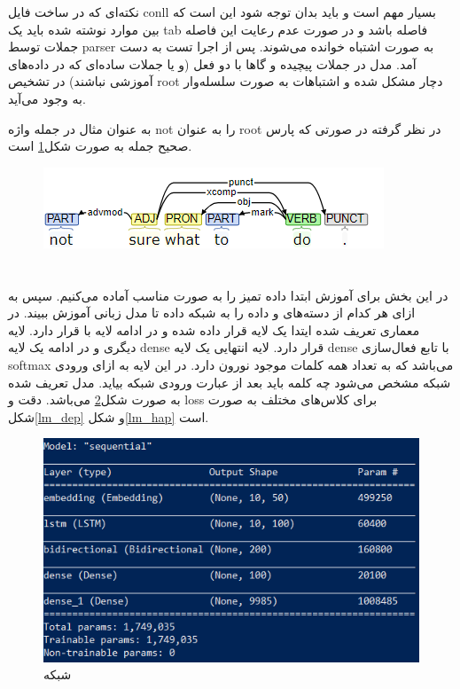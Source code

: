 \documentclass[10pt]{article}
\begin{document}
نکته‌‌ای که در ساخت فایل conll بسیار مهم است و باید بدان توجه شود این است که بین موارد نوشته شده باید یک tab فاصله باشد و در صورت عدم رعایت این فاصله جملات توسط parser به صورت اشتباه خوانده می‌شوند. 
پس از اجرا تست
به دست آمد. مدل در جملات پیچیده و گاها با دو فعل (و یا جملات ساده‌ای که در داده‌های آموزشی نباشند) در تشخیص root دچار مشکل شده و اشتباهات به صورت سلسله‌وار به وجود می‌آید.

به عنوان مثال در جمله
واژه not را به عنوان root در نظر گرفته در صورتی که پارس صحیح جمله به صورت شکل\ref{dep_parser_2} است.
\begin{figure}[ht!]
	\centering\includegraphics[width=0.7\linewidth]{../reports/dep_parser_2.png}
	\caption{
		}
	\label{dep_parser_2}
\end{figure}
\newpage
\section{
	}
	در این بخش برای آموزش 
	ابتدا داده تمیز را به صورت مناسب آماده می‌کنیم. سپس به ازای هر کدام از دسته‌های 
	و
	داده را به شبکه داده تا مدل زبانی آموزش ببیند. در معماری تعریف شده ایتدا یک لایه 
	قرار داده شده و در ادامه لایه 
	با 
	قرار دارد. لایه دیگری
	و در ادامه یک لایه dense قرار دارد. لایه انتهایی یک لایه dense با تابع فعال‌سازی softmax می‌باشد که به تعداد همه کلمات موجود نورون دارد. در این لایه به ازای ورودی شبکه مشخص می‌شود چه کلمه باید بعد از عبارت ورودی شبکه بیاید.
	مدل تعریف شده به صورت شکل\ref{lm}
	می‌باشد. دقت و loss برای کلاس‌های مختلف به صورت شکل\ref{lm_dep} و شکل\ref{lm_hap} است. 

	
		\begin{figure}[ht!]
		\centering\includegraphics[width=0.8\linewidth]{../reports/lm_model.png}
		\caption{شبکه 
			}
		\label{lm}
	\end{figure}
	
\end{document}
